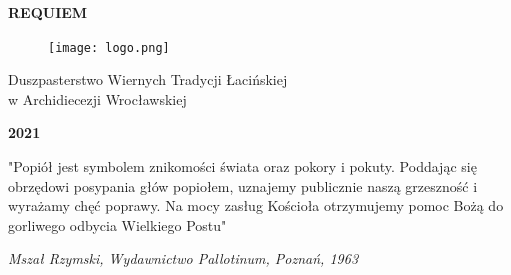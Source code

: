 \documentclass[10pt,a5paper]{mszalik}
\begin{document}
\thispagestyle{empty}

\begin{center}
	\vspace*{0.5cm}


	\bfseries\scshape
	\huge REQUIEM

	\vfill


	\vfill

	\begin{figure}[h]
		\centering
		\texttt{[image: logo.png]}
	\end{figure}


	{\large Duszpasterstwo Wiernych Tradycji Łacińskiej \\ w Archidiecezji Wrocławskiej}

	\bigskip

	{\Large \textbf{2021}}


\end{center}



\vspace*{2cm}
"Popiół jest symbolem znikomości świata oraz pokory i pokuty. Poddając się
obrzędowi posypania głów popiołem, uznajemy publicznie naszą grzeszność i wyrażamy
chęć poprawy. Na mocy zasług Kościoła otrzymujemy pomoc Bożą do gorliwego odbycia
Wielkiego Postu"

\bigskip

\hfill \textit{Mszał Rzymski, Wydawnictwo Pallotinum, Poznań, 1963}

\vspace*{\fill}

\hrulefill
\end{document}
